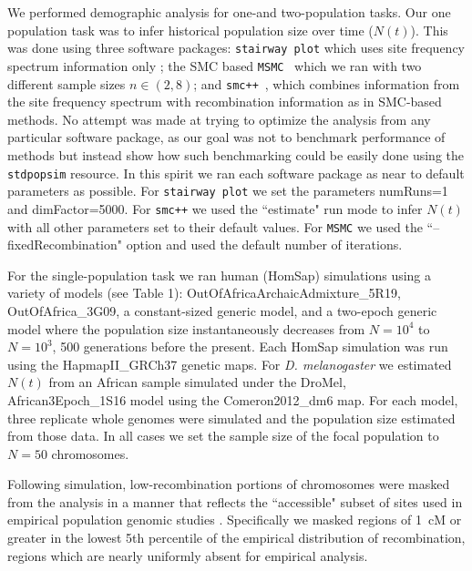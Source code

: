 \documentclass[12pt,halfline,a4paper]{ouparticle}
\newcommand{\stdpopsim}{\texttt{stdpopsim}\xspace}
\newcommand{\MSMC}{\texttt{MSMC}\xspace}
\newcommand{\smcpp}{\texttt{smc++}\xspace}
\newcommand{\stairwayplot}{\texttt{stairway plot}\xspace}
\begin{document}
We performed demographic analysis for one-and two-population tasks.
Our one population task was to infer historical population size over
time ($N(t)$). This was done using three software packages: \stairwayplot
which uses site frequency spectrum information only \citep{liu2015exploring};
the SMC based \MSMC~\citep{schiffels2014inferring} which we ran with two different
sample sizes $n\in (2 , 8)$; and \smcpp~\citep{terhorst2017robust},
which combines information from the site frequency spectrum with
recombination information as in SMC-based methods. No attempt
was made at trying to optimize the analysis from
any particular software package,
as our goal was not to benchmark performance of methods but
instead show how such benchmarking could be easily done using
the \stdpopsim resource. In this spirit we ran each software package as near
to default parameters as possible. For \stairwayplot we
set the parameters numRuns=1 and dimFactor=5000. For \smcpp we used the
``estimate" run mode to infer $N(t)$ with all other parameters set
to their default values. For \MSMC we used the ``--fixedRecombination"
option and used the default number of iterations.

For the single-population task we ran human (HomSap) simulations
using a variety of models (see Table 1): OutOfAfricaArchaicAdmixture\_5R19, OutOfAfrica\_3G09,
a constant-sized generic model, and a two-epoch generic model where the
population size instantaneously decreases from $N=10^4$ to $N=10^3$, 500
generations before the present. Each HomSap simulation was run
using the HapmapII\_GRCh37 genetic maps. For \emph{D. melanogaster}
we estimated $N(t)$ from an African sample simulated under the DroMel,
African3Epoch\_1S16 model using the Comeron2012\_dm6 map.
For each model, three replicate whole genomes were
simulated and the population size estimated from those data. In all cases we
set the sample size of the focal population to $N=50$ chromosomes.

Following simulation, low-recombination portions of chromosomes were masked
from the analysis in a manner that reflects the ``accessible" subset of sites
used in empirical population genomic studies \citep[e.g.,][]{danecek20111000,langley2012genomic}.
Specifically we masked regions of \SI{1}{cM} or greater in the lowest 5th percentile of the empirical
distribution of recombination, regions which are nearly uniformly absent for
empirical analysis.
\end{document}
